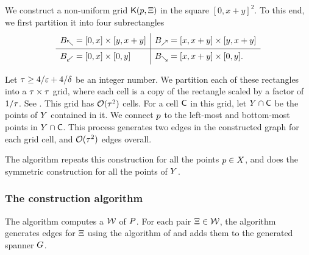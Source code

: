 \documentclass[12pt]{article}%
\begin{document}
We construct a non-uniform grid $\mathsf{K}(p, \Xi)$ in the square
$[0,x+y]^2$.  To this end, we first partition it into four
subrectangles
\begin{equation*}
    \begin{array}{l|l}
      B_\nwarrow = [0,x] \times [y,x+y]
      &
        B_\nearrow = [x,x+y] \times [y,x+y]\Bigr.\\
      \hline
      B_{\swarrow} = [0,x]\times [0,y]
      &
        B_\searrow = [x,x+y] \times [0,y].\Bigr.\\
    \end{array}
\end{equation*}


Let $\tau \geq 4/\varepsilon + 4/\delta$ be an integer number.  We
partition each of these rectangles into a $\tau \times \tau$
grid, where each cell is a copy of the rectangle scaled by a factor of
$1/\tau$.  See . This grid has $\mathcal{O}(\tau^2)$
cells. For a cell $\mathsf{C}$ in this grid, let $Y \cap \mathsf{C}$ be the
points of $Y$ contained in it. We connect $p$ to the left-most
and bottom-most points in $Y \cap \mathsf{C}$. This process generates
two edges in the constructed graph for each grid cell, and
$\mathcal{O}( \tau^2)$ edges overall.

The algorithm repeats this construction for all the points
$p \in X$, and does the symmetric construction for all the points
of $Y$.


\subsubsection{The construction algorithm}

The algorithm computes a \QSPD $\mathcal{W}$ of $P$. For each pair
$\Xi \in \mathcal{W}$, the algorithm generates edges for $\Xi$ using the
algorithm of  and adds them to the generated
spanner $G$.
\end{document}
